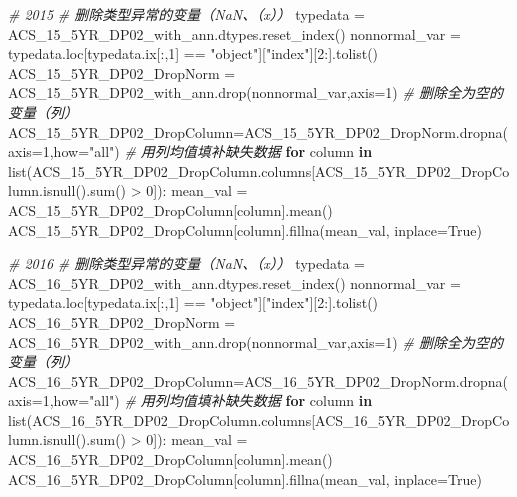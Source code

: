 \documentclass[
]{article}
\newenvironment{Shaded}{}{}
\newcommand{\BuiltInTok}[1]{#1}
\newcommand{\CommentTok}[1]{\textcolor[rgb]{0.38,0.63,0.69}{\textit{#1}}}
\newcommand{\ControlFlowTok}[1]{\textcolor[rgb]{0.00,0.44,0.13}{\textbf{#1}}}
\newcommand{\DecValTok}[1]{\textcolor[rgb]{0.25,0.63,0.44}{#1}}
\newcommand{\KeywordTok}[1]{\textcolor[rgb]{0.00,0.44,0.13}{\textbf{#1}}}
\newcommand{\NormalTok}[1]{#1}
\newcommand{\OperatorTok}[1]{\textcolor[rgb]{0.40,0.40,0.40}{#1}}
\newcommand{\StringTok}[1]{\textcolor[rgb]{0.25,0.44,0.63}{#1}}
\newcommand{\VariableTok}[1]{\textcolor[rgb]{0.10,0.09,0.49}{#1}}
\begin{document}
\begin{Shaded}
\begin{Highlighting}[]
\CommentTok{\# 2015}
\CommentTok{\# 删除类型异常的变量（NaN、（x））}
\NormalTok{typedata }\OperatorTok{=}\NormalTok{ ACS\_15\_5YR\_DP02\_with\_ann.dtypes.reset\_index()}
\NormalTok{nonnormal\_var }\OperatorTok{=}\NormalTok{ typedata.loc[typedata.ix[:,}\DecValTok{1}\NormalTok{] }\OperatorTok{==} \StringTok{"object"}\NormalTok{][}\StringTok{"index"}\NormalTok{][}\DecValTok{2}\NormalTok{:].tolist()}
\NormalTok{ACS\_15\_5YR\_DP02\_DropNorm }\OperatorTok{=}\NormalTok{ ACS\_15\_5YR\_DP02\_with\_ann.drop(nonnormal\_var,axis}\OperatorTok{=}\DecValTok{1}\NormalTok{)}
\CommentTok{\# 删除全为空的变量（列）}
\NormalTok{ACS\_15\_5YR\_DP02\_DropColumn}\OperatorTok{=}\NormalTok{ACS\_15\_5YR\_DP02\_DropNorm.dropna(axis}\OperatorTok{=}\DecValTok{1}\NormalTok{,how}\OperatorTok{=}\StringTok{"all"}\NormalTok{)}
\CommentTok{\# 用列均值填补缺失数据}
\ControlFlowTok{for}\NormalTok{ column }\KeywordTok{in} \BuiltInTok{list}\NormalTok{(ACS\_15\_5YR\_DP02\_DropColumn.columns[ACS\_15\_5YR\_DP02\_DropColumn.isnull().}\BuiltInTok{sum}\NormalTok{() }\OperatorTok{\textgreater{}} \DecValTok{0}\NormalTok{]):}
\NormalTok{    mean\_val }\OperatorTok{=}\NormalTok{ ACS\_15\_5YR\_DP02\_DropColumn[column].mean()}
\NormalTok{    ACS\_15\_5YR\_DP02\_DropColumn[column].fillna(mean\_val, inplace}\OperatorTok{=}\VariableTok{True}\NormalTok{)}

\CommentTok{\# 2016}
\CommentTok{\# 删除类型异常的变量（NaN、（x））}
\NormalTok{typedata }\OperatorTok{=}\NormalTok{ ACS\_16\_5YR\_DP02\_with\_ann.dtypes.reset\_index()}
\NormalTok{nonnormal\_var }\OperatorTok{=}\NormalTok{ typedata.loc[typedata.ix[:,}\DecValTok{1}\NormalTok{] }\OperatorTok{==} \StringTok{"object"}\NormalTok{][}\StringTok{"index"}\NormalTok{][}\DecValTok{2}\NormalTok{:].tolist()}
\NormalTok{ACS\_16\_5YR\_DP02\_DropNorm }\OperatorTok{=}\NormalTok{ ACS\_16\_5YR\_DP02\_with\_ann.drop(nonnormal\_var,axis}\OperatorTok{=}\DecValTok{1}\NormalTok{)}
\CommentTok{\# 删除全为空的变量（列）}
\NormalTok{ACS\_16\_5YR\_DP02\_DropColumn}\OperatorTok{=}\NormalTok{ACS\_16\_5YR\_DP02\_DropNorm.dropna(axis}\OperatorTok{=}\DecValTok{1}\NormalTok{,how}\OperatorTok{=}\StringTok{"all"}\NormalTok{)}
\CommentTok{\# 用列均值填补缺失数据}
\ControlFlowTok{for}\NormalTok{ column }\KeywordTok{in} \BuiltInTok{list}\NormalTok{(ACS\_16\_5YR\_DP02\_DropColumn.columns[ACS\_16\_5YR\_DP02\_DropColumn.isnull().}\BuiltInTok{sum}\NormalTok{() }\OperatorTok{\textgreater{}} \DecValTok{0}\NormalTok{]):}
\NormalTok{    mean\_val }\OperatorTok{=}\NormalTok{ ACS\_16\_5YR\_DP02\_DropColumn[column].mean()}
\NormalTok{    ACS\_16\_5YR\_DP02\_DropColumn[column].fillna(mean\_val, inplace}\OperatorTok{=}\VariableTok{True}\NormalTok{)}


\end{Highlighting}
\end{Shaded}
\end{document}
